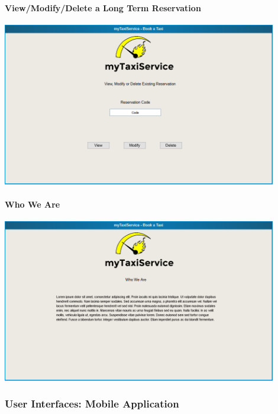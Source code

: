 		\paragraph{View/Modify/Delete a Long Term Reservation}
		\begin{center}
			\includegraphics[width=0.90\textwidth]{./images/modify_delete_reservation}
		\end{center}
		\paragraph{Who We Are}
		\begin{center}
			\includegraphics[width=0.90\textwidth]{./images/who_we_are}
		\end{center}
		
		\subsubsection{User Interfaces: Mobile Application}

